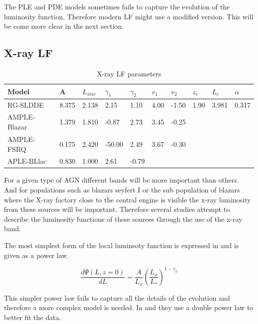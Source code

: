\documentclass{article}
\begin{document}
The PLE and PDE models sometimes fails to capture the evolution of the luminosity function. Therefore modern 
LF might use a modified version. This will be come more clear in the next section.

\subsection{X-ray LF}

\begin{table}
\centering
\begin{tabularx}{\textwidth}{|l|X|X|X|X|X|X|X|X|X|}
\hline
Model & A & $L_{star}$ & $\gamma _1$ &  $\gamma _2$  & $v_1$ & $v_2$ & $z_c$ & $L_c$ & $ \alpha$\\
\hline
RG-SLDDE & 8.375 & 2.138 & 2.15 & 1.10 & 4.00 & -1.50 & 1.90 & 3.981 & 0.317  \\
\hline
AMPLE-Blazar & 1.379 & 1.810 & -0.87 & 2.73 & 3.45 & -0.25 & & &  \\
\hline
AMPLE-FSRQ & 0.175 & 2.420& -50.00 & 2.49 & 3.67 & -0.30 & & &  \\
\hline
APLE-BLlac & 0.830& 1.000 & 2.61 & -0.79 & & & & &  \\
\hline
\end{tabularx}
\caption{X-ray LF parameters}
\end{table}



For a given type of AGN different bands will be more important than others. And for populations such as blazars seyfert I or the sub population of blazars where the 
X-ray factory close to the central engine is visible the x-ray luminosity from these sources will be important. 
Therefore several studies attempt to describe the luminosity functions of these sources through the use of the x-ray band. 

The most simplest form of the local luminsoty function is expressed in \cite{Ajello_2009} and is given as a power law.

\begin{equation}
    \frac{d\Psi(L,z=0)}{dL} = \frac{A}{L_x} \left( \frac{L_x}{L_*}\right)^{1-\gamma_2}
\end{equation}

This simpler power law fails to capture all the details of the evolution and
therefore a more complex model is needed. In \cite{Ajello_2009} and  \cite{Ueda_2003} 
they use a double power law to better fit the data.
   
\end{document}
